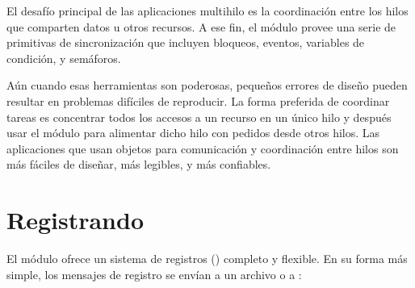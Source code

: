 \documentclass[a4,10pt,spanish]{sphinxmanual}
\begin{document}
\sphinxAtStartPar
El desafío principal de las aplicaciones multi\sphinxhyphen{}hilo es la coordinación entre los hilos que comparten datos u otros recursos.  A ese fin, el módulo  provee una serie de primitivas de sincronización que incluyen bloqueos, eventos, variables de condición, y semáforos.

\sphinxAtStartPar
Aún cuando esas herramientas son poderosas, pequeños errores de diseño pueden resultar en problemas difíciles de reproducir.  La forma preferida de coordinar tareas es concentrar todos los accesos a un recurso en un único hilo y después usar el módulo  para alimentar dicho hilo con pedidos desde otros hilos.  Las aplicaciones que usan objetos  para comunicación y coordinación entre hilos son más fáciles de diseñar, más legibles, y más confiables.


\section{Registrando}
\label{\detokenize{tutorial/stdlib2:logging}}\label{\detokenize{tutorial/stdlib2:tut-logging}}
\sphinxAtStartPar
El módulo  ofrece un sistema de registros () completo y flexible.  En su forma más simple, los mensajes de registro se envían a un archivo o a :

\begin{sphinxVerbatim}[commandchars=\\\{\}]
 
 
\end{sphinxVerbatim}
\end{document}
